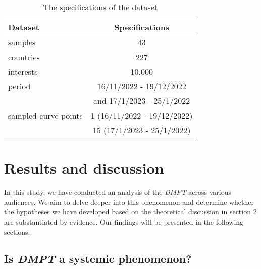\documentclass[twocolumn]{bmcart}\usepackage{lineno}
\begin{document}
\begin{center}
    \begin{table}[!t]
    \caption{The specifications of the dataset 
    {\label{tab:Datasets}}}
    \begin{adjustbox}{center}

\begin{tabular}{|l|c|}
    \hline
    Dataset &  Specifications \\
    \hline
      samples & 43  \\countries & 227  \\ interests & 10,000 \\ period & 16/11/2022 - 19/12/2022 \\& and 17/1/2023 - 25/1/2022 \\
     sampled curve points & 1 (16/11/2022 - 19/12/2022)\\& 15 (17/1/2023 - 25/1/2022)\\


    \hline
\end{tabular}
\end{adjustbox}


 \end{table}
\end{center}
































 





\section{Results and discussion}
In this study, we have conducted an analysis of the \emph{DMPT} across various audiences. We aim to delve deeper into this phenomenon and determine whether the hypotheses we have developed based on the theoretical discussion in section 2 are substantiated by evidence. Our findings will be presented in the following sections.
\subsection{Is \emph{DMPT} a systemic phenomenon?}\label{systemic}
\end{document}

